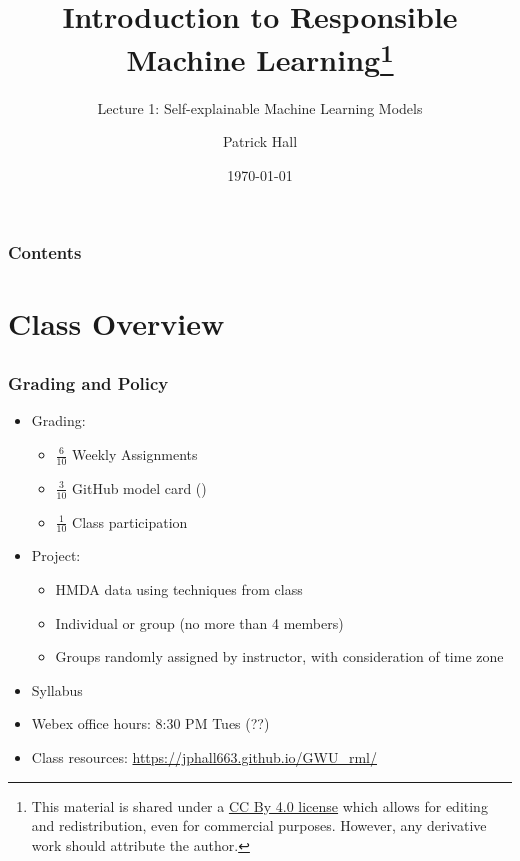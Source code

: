 \documentclass[11pt,aspectratio=169,hyperref={colorlinks}]{beamer}
\author{Patrick Hall}
\title{Introduction to Responsible Machine Learning\footnote{\tiny{This material is shared under a \href{https://creativecommons.org/licenses/by/4.0/deed.ast}{CC By 4.0 license} which allows for editing and redistribution, even for commercial purposes. However, any derivative work should attribute the author.}}}
\subtitle{Lecture 1: Self-explainable Machine Learning Models}
\institute{The George Washington University}
\date{\today}
\begin{document}
	
	\maketitle
	
	\begin{frame}
	
		\frametitle{Contents}
		
		\tableofcontents{}
		
	\end{frame}
	

	\section{Class Overview}
	\subsection*{}
	
	\begin{frame}
	
		\frametitle{Grading and Policy}
			
		\begin{itemize}
			\item{Grading:}
				\begin{itemize}
					\item{$\frac{6}{10}$ Weekly Assignments}
					\item{$\frac{3}{10}$ GitHub model card (\cite{model_cards})}
                    \item{$\frac{1}{10}$ Class participation}
				\end{itemize}
			\item{Project:}	
				\begin{itemize}
					\item{HMDA data using techniques from class}
					\item{Individual or group (no more than 4 members)}
					\item Groups randomly assigned by instructor, with consideration of time zone
				\end{itemize}
			\item{Syllabus}
			\item{Webex office hours: 8:30 PM Tues (??)}
			\item{Class resources: \url{https://jphall663.github.io/GWU_rml/}}	
		\end{itemize}		
			
	\end{frame}
	
\end{document}
